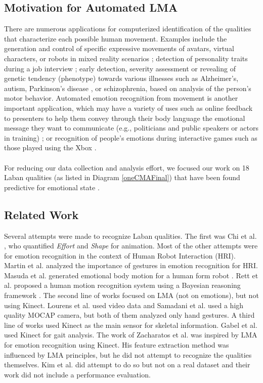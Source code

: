 \documentclass[journal]{journal}
\begin{document}
\subsection{Motivation for Automated LMA}
There are numerous applications for computerized identification of the qualities that characterize each possible human movement. Examples include the generation and control of specific expressive movements 
of avatars, virtual characters, or robots in mixed reality scenarios
\cite{Masuda}; detection of personality traits during a job interview
\cite{levy2003use}; early detection, severity assessment or revealing of genetic tendency (phenotype) towards various illnesses such as Alzheimer's,
autism, Parkinson's disease \cite{camurri2003application}, or schizophrenia,
based on analysis of the person's motor behavior. Automated emotion recognition from movement is another 
important application, which may have a variety of uses such as online feedback 
to presenters to help them convey through their body language the emotional message they want to communicate 
(e.g., politicians and public speakers or actors in training) \cite{nguyen2012online}; or recognition 
of people's emotions during interactive games such as those played using the Xbox \cite{Zacharatos}. 
\\\\For reducing our data collection and analysis effort, we focused our work on
18 Laban qualities (as listed in Diagram \ref{oneCMAFinal}) that have been found
predictive for emotional state \cite{ShafirPrivate}.

\subsection{Related Work}
Several attempts were made to recognize Laban qualities. The first was Chi et al. \cite{chi2000emote}, who quantified \textit{Effort} and \textit{Shape} for animation. Most of the other attempts were for emotion recognition in the context of Human Robot Interaction (HRI). Martin et al. \cite{martin} analyzed the importance of gestures in emotion recognition for HRI. Masuda et al. generated emotional body motion for a human 
form robot \cite{Masuda}. Rett et al. proposed a human motion recognition 
system using a Bayesian reasoning framework \cite{Rett}. The second line of works focused on LMA (not on emotions), but not using Kinect. Lourens et al. \cite{lourens2010communicating} used video data and Samadani et al.
\cite{samadani2013laban} used a high quality MOCAP camera, but both of them
analyzed only hand gestures. A third line of works used Kinect as the main
sensor for skeletal information. Gabel et al.
\cite{gabel2012full} used Kinect for gait analysis. The work of
Zacharatos et al. \cite{Zacharatos} was inspired by LMA for emotion recognition using Kinect. His feature extraction method was influenced by LMA principles, but he did not attempt to recognize the qualities themselves. Kim et al. \cite{kim} did attempt to do so but not on a real dataset and their work did not include a performance evaluation.
\end{document}
